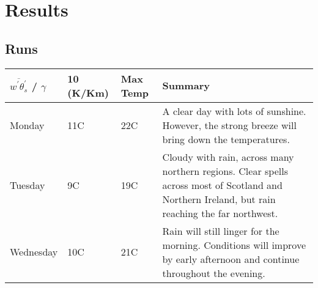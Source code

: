 
\chapter{Results}
\label{ch:results}

\section{Runs}
\label{sec:Runs}
\begin{center}
    \begin{tabular}{ | l | l | l | p{5cm} |}
    \hline
    $\overline{w^{'}\theta^{'}_{s}}$ / $\gamma$ & 10 (K/Km) & Max Temp & Summary \\ \hline
    Monday & 11C & 22C & A clear day with lots of sunshine.  
    However, the strong breeze will bring down the temperatures. \\ \hline
    Tuesday & 9C & 19C & Cloudy with rain, across many northern regions. Clear spells
    across most of Scotland and Northern Ireland,
    but rain reaching the far northwest. \\ \hline
    Wednesday & 10C & 21C & Rain will still linger for the morning.
    Conditions will improve by early afternoon and continue
    throughout the evening. \\
    \hline
    \end{tabular}
\end{center}







